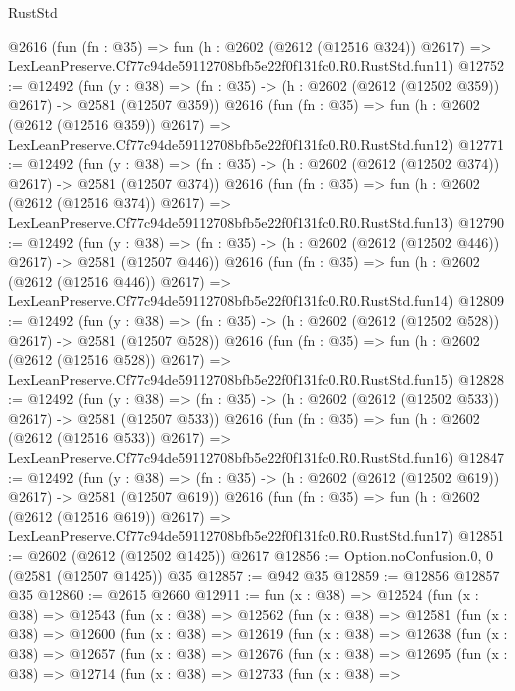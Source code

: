 \begin{lexlean}{RustStd}
\begin{coremodule}
    @2616
    (fun (fn : @35) =>
    fun (h : @2602 (@2612 (@12516 @324)) @2617) =>
    LexLeanPreserve.Cf77c94de59112708bfb5e22f0f131fc0.R0.RustStd.fun11)
@12752 := @12492
    (fun (y : @38) => (fn : @35) -> (h : @2602 (@2612 (@12502 @359)) @2617) -> @2581 (@12507 @359))
    @2616
    (fun (fn : @35) =>
    fun (h : @2602 (@2612 (@12516 @359)) @2617) =>
    LexLeanPreserve.Cf77c94de59112708bfb5e22f0f131fc0.R0.RustStd.fun12)
@12771 := @12492
    (fun (y : @38) => (fn : @35) -> (h : @2602 (@2612 (@12502 @374)) @2617) -> @2581 (@12507 @374))
    @2616
    (fun (fn : @35) =>
    fun (h : @2602 (@2612 (@12516 @374)) @2617) =>
    LexLeanPreserve.Cf77c94de59112708bfb5e22f0f131fc0.R0.RustStd.fun13)
@12790 := @12492
    (fun (y : @38) => (fn : @35) -> (h : @2602 (@2612 (@12502 @446)) @2617) -> @2581 (@12507 @446))
    @2616
    (fun (fn : @35) =>
    fun (h : @2602 (@2612 (@12516 @446)) @2617) =>
    LexLeanPreserve.Cf77c94de59112708bfb5e22f0f131fc0.R0.RustStd.fun14)
@12809 := @12492
    (fun (y : @38) => (fn : @35) -> (h : @2602 (@2612 (@12502 @528)) @2617) -> @2581 (@12507 @528))
    @2616
    (fun (fn : @35) =>
    fun (h : @2602 (@2612 (@12516 @528)) @2617) =>
    LexLeanPreserve.Cf77c94de59112708bfb5e22f0f131fc0.R0.RustStd.fun15)
@12828 := @12492
    (fun (y : @38) => (fn : @35) -> (h : @2602 (@2612 (@12502 @533)) @2617) -> @2581 (@12507 @533))
    @2616
    (fun (fn : @35) =>
    fun (h : @2602 (@2612 (@12516 @533)) @2617) =>
    LexLeanPreserve.Cf77c94de59112708bfb5e22f0f131fc0.R0.RustStd.fun16)
@12847 := @12492
    (fun (y : @38) => (fn : @35) -> (h : @2602 (@2612 (@12502 @619)) @2617) -> @2581 (@12507 @619))
    @2616
    (fun (fn : @35) =>
    fun (h : @2602 (@2612 (@12516 @619)) @2617) =>
    LexLeanPreserve.Cf77c94de59112708bfb5e22f0f131fc0.R0.RustStd.fun17)
@12851 := @2602 (@2612 (@12502 @1425)) @2617
@12856 := Option.noConfusion.{0, 0} (@2581 (@12507 @1425)) @35
@12857 := @942 @35
@12859 := @12856 @12857 @35
@12860 := @2615 @2660
@12911 := fun (x : @38) =>
  @12524
    (fun (x : @38) =>
    @12543
      (fun (x : @38) =>
      @12562
        (fun (x : @38) =>
        @12581
          (fun (x : @38) =>
          @12600
            (fun (x : @38) =>
            @12619
              (fun (x : @38) =>
              @12638
                (fun (x : @38) =>
                @12657
                  (fun (x : @38) =>
                  @12676
                    (fun (x : @38) =>
                    @12695
                      (fun (x : @38) =>
                      @12714
                        (fun (x : @38) =>
                        @12733
                          (fun (x : @38) =>

\end{coremodule}
\end{lexlean}
